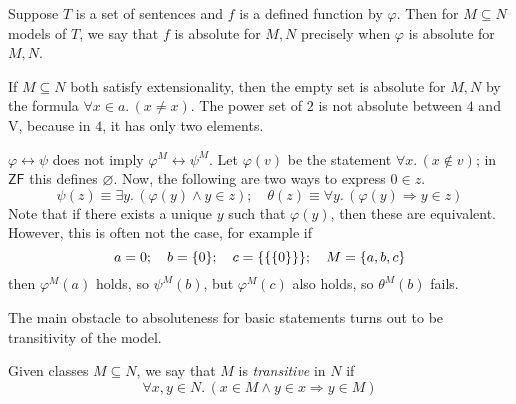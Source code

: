 Suppose \( T \) is a set of sentences and \( f \) is a defined function by \( \varphi \).
Then for \( M \subseteq N \) models of \( T \), we say that \( f \) is absolute for \( M, N \) precisely when \( \varphi \) is absolute for \( M, N \).
\begin{example}
    If \( M \subseteq N \) both satisfy extensionality, then the empty set is absolute for \( M, N \) by the formula \( \forall x \in a.\, (x \neq x) \).
    The power set of \( 2 \) is not absolute between \( 4 \) and \( \mathrm{V} \), because in \( 4 \), it has only two elements.
\end{example}
\begin{example}
    \( \varphi \leftrightarrow \psi \) does not imply \( \varphi^M \leftrightarrow \psi^M \).
    Let \( \varphi(v) \) be the statement \( \forall x.\, (x \notin v) \); in \( \mathsf{ZF} \) this defines \( \varnothing \).
    Now, the following are two ways to express \( 0 \in z \).
    \[ \psi(z) \equiv \exists y.\, (\varphi(y) \wedge y \in z);\quad \theta(z) \equiv \forall y.\, (\varphi(y) \Rightarrow y \in z) \]
    Note that if there exists a unique \( y \) such that \( \varphi(y) \), then these are equivalent.
    However, this is often not the case, for example if
    \[ a = 0;\quad b = \qty{0};\quad c = \qty{\qty{\qty{0}}};\quad M = \qty{a, b, c} \]
    then \( \varphi^M(a) \) holds, so \( \psi^M(b) \), but \( \varphi^M(c) \) also holds, so \( \theta^M(b) \) fails.
\end{example}
The main obstacle to absoluteness for basic statements turns out to be transitivity of the model.
\begin{definition}
    Given classes \( M \subseteq N \), we say that \( M \) is \emph{transitive} in \( N \) if
    \[ \forall x, y \in N.\, (x \in M \wedge y \in x \Rightarrow y \in M) \]
\end{definition}

